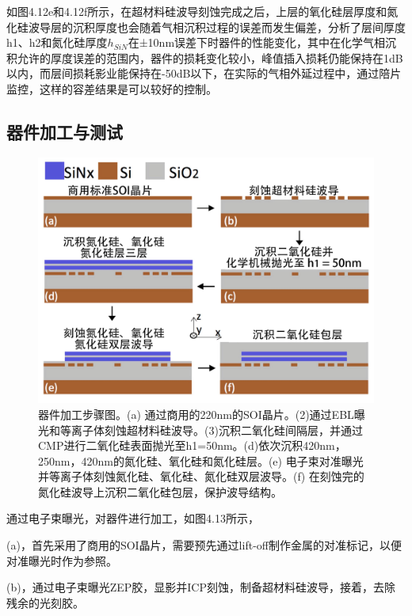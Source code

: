 如图4.12e和4.12f所示，在超材料硅波导刻蚀完成之后，上层的氧化硅层厚度和氮化硅波导层的沉积厚度也会随着气相沉积过程的误差而发生偏差，分析了层间厚度h1、h2和氮化硅厚度$h_{SiN}$在±10nm误差下时器件的性能变化，其中在化学气相沉积允许的厚度误差的范围内，器件的损耗变化较小，峰值插入损耗仍能保持在1dB以内，而层间损耗影业能保持在-50dB以下，在实际的气相外延过程中，通过陪片监控，这样的容差结果是可以较好的控制。

\subsection{器件加工与测试}

\begin{figure}[!htbp]
    \centering
    \includegraphics[width=1\textwidth]{Img/4-13.png}
    \caption{器件加工步骤图。(a) 通过商用的220nm的SOI晶片。(2)通过EBL曝光和等离子体刻蚀超材料硅波导。(3)沉积二氧化硅间隔层，并通过CMP进行二氧化硅表面抛光至h1=50nm。(d)依次沉积420nm，250nm，420nm的氮化硅、氧化硅和氮化硅层。(e) 电子束对准曝光并等离子体刻蚀氮化硅、氧化硅、氮化硅双层波导。(f) 在刻蚀完的氮化硅波导上沉积二氧化硅包层，保护波导结构。}
    \label{fig:4-13}
\end{figure}

通过电子束曝光，对器件进行加工，如图4.13所示，

(a)，首先采用了商用的SOI晶片，需要预先通过lift-off制作金属的对准标记，以便对准曝光时作为参照。

(b)，通过电子束曝光ZEP胶，显影并ICP刻蚀，制备超材料硅波导，接着，去除残余的光刻胶。

